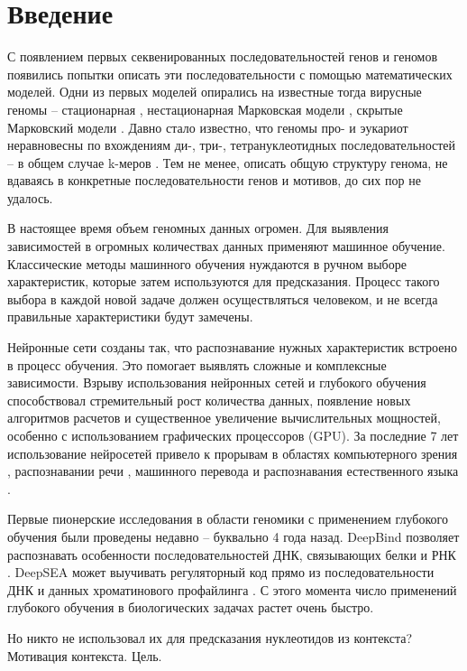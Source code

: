\section{Введение}

С появлением первых секвенированных последовательностей генов и геномов появились попытки описать эти последовательности с помощью математических моделей.
Одни из первых моделей опирались на известные тогда вирусные геномы -- стационарная \cite{garden_markov_1980}, нестационарная Марковская модели \cite{tavare_codon_1989}, скрытые Марковский модели \cite{churchill_stochastic_1989}. 
Давно стало известно, что геномы про- и эукариот неравновесны по вхождениям ди-, три-, тетрануклеотидных последовательностей -- в общем случае k-меров \cite{phillips_mono-_1987}. 
Тем не менее, описать общую структуру генома, не вдаваясь в конкретные последовательности генов и мотивов, до сих пор не удалось.

В настоящее время объем геномных данных огромен. Для выявления зависимостей в огромных количествах данных применяют машинное обучение. Классические методы машинного обучения нуждаются в ручном выборе характеристик, которые затем используются для предсказания. Процесс такого выбора в каждой новой задаче должен осуществляться человеком, и не всегда правильные характеристики будут замечены.

Нейронные сети созданы так, что распознавание нужных характеристик встроено в процесс обучения. Это помогает выявлять сложные и комплексные зависимости.
Взрыву использования нейронных сетей и глубокого обучения способствовал стремительный рост количества данных, появление новых алгоритмов расчетов и существенное увеличение вычислительных мощностей, особенно с использованием графических процессоров (GPU).
За последние 7 лет использование нейросетей привело к прорывам в областях компьютерного зрения \cite{krizhevsky_imagenet_2012, girshick_region-based_2016, long_fully_2015}, распознавании речи \cite{hannun_deep_2014}, машинного перевода и распознавания естественного языка \cite{wu_googles_2016}.

Первые пионерские исследования в области геномики с применением глубокого обучения были проведены недавно -- буквально 4 года назад. DeepBind позволяет распознавать особенности последовательностей ДНК, связывающих белки и РНК \cite{alipanahi_predicting_2015}. DeepSEA может выучивать регуляторный код  прямо из последовательности ДНК и данных хроматинового профайлинга \cite{zhou_predicting_2015}. 
С этого момента число применений глубокого обучения в биологических задачах растет очень быстро.

Но никто не использовал их для предсказания нуклеотидов из контекста? Мотивация контекста. Цель.
